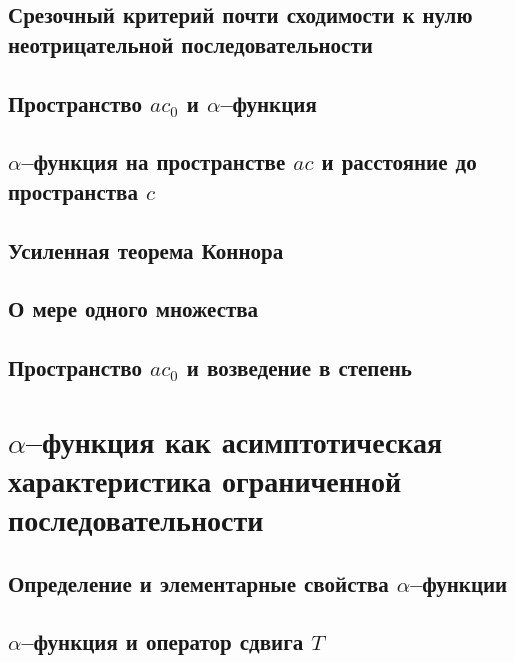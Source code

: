 \documentclass[12pt,a4paper,openbib]{report}
\theoremstyle{definition}
\begin{document}
	\section{Срезочный критерий почти сходимости к нулю неотрицательной последовательности}
	

	\section{Пространство $ac_0$ и $\alpha$--функция}
	

	\section{$\alpha$--функция на пространстве $ac$ и расстояние до пространства $c$}
	

	\section{Усиленная теорема Коннора}
	

	\section{О мере одного множества}
	

	\section{Пространство $ac_0$ и возведение в степень}
	


\chapter{$\alpha$--функция как асимптотическая характеристика ограниченной последовательности}

	\section{Определение и элементарные свойства $\alpha$--функции}
	

	\section{$\alpha$--функция и оператор сдвига $T$}
	
\end{document}

